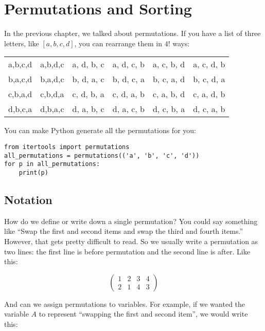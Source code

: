 \chapter{Permutations and Sorting}

In the previous chapter, we talked about permutations. If you have a list
of three letters, like $[a, b, c, d]$, you can rearrange them in $4!$
ways:

\begin{tabular}{c c c c c c}
  a,b,c,d & a,b,d,c & a, d, b, c & a, d, c, b & a, c, b, d & a, c, d, b \\
  b,a,c,d & b,a,d,c & b, d, a, c & b, d, c, a & b, c, a, d & b, c, d, a \\
  c,b,a,d & c,b,d,a & c, d, b, a & c, d, a, b & c, a, b, d & c, a, d, b \\
  d,b,c,a & d,b,a,c & d, a, b, c & d, a, c, b & d, c, b, a & d, c, a, b
\end{tabular}

You can make Python generate all the permutations for you:

\begin{Verbatim}
from itertools import permutations
all_permutations = permutations(('a', 'b', 'c', 'd'))
for p in all_permutations:
    print(p)
\end{Verbatim}

\section{Notation}

How do we define or write down a single permutation? You could say
something like ``Swap the first and second items and swap the third
and fourth items.'' However, that gets pretty difficult to read. So we
usually write a permutation as two lines: the first line is before
permutation and the second line is after.  Like this:

$$\begin{pmatrix}
  1 & 2 & 3 & 4 \\
  2 & 1 & 4 & 3
\end{pmatrix}$$

And can we assign permutations to variables. For example, if we wanted the
variable $A$ to represent ``swapping the first and second item'', we
would write this:

